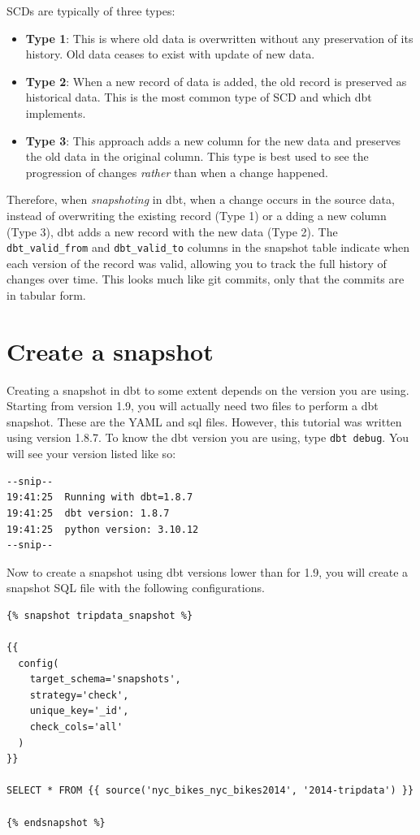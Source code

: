 \documentclass[
]{book}
\begin{document}
SCDs are typically of three types:

\begin{itemize}
\item
  \textbf{Type 1}: This is where old data is overwritten without any preservation of its history. Old data ceases to exist with update of new data.
\item
  \textbf{Type 2}: When a new record of data is added, the old record is preserved as historical data. This is the most common type of SCD and which dbt implements.
\item
  \textbf{Type 3}: This approach adds a new column for the new data and preserves the old data in the original column. This type is best used to see the progression of changes \emph{rather} than when a change happened.
\end{itemize}

Therefore, when \emph{snapshoting} in dbt, when a change occurs in the source data, instead of overwriting the existing record (Type 1) or a dding a new column (Type 3), dbt adds a new record with the new data (Type 2). The \texttt{dbt\_valid\_from} and \texttt{dbt\_valid\_to} columns in the snapshot table indicate when each version of the record was valid, allowing you to track the full history of changes over time. This looks much like git commits, only that the commits are in tabular form.

\hypertarget{create-a-snapshot}{%
\section{Create a snapshot}\label{create-a-snapshot}}

Creating a snapshot in dbt to some extent depends on the version you are using. Starting from version 1.9, you will actually need two files to perform a dbt snapshot. These are the YAML and sql files. However, this tutorial was written using version 1.8.7. To know the dbt version you are using, type \texttt{dbt\ debug}. You will see your version listed like so:

\begin{verbatim}
--snip--
19:41:25  Running with dbt=1.8.7
19:41:25  dbt version: 1.8.7
19:41:25  python version: 3.10.12
--snip--
\end{verbatim}

Now to create a snapshot using dbt versions lower than for 1.9, you will create a snapshot SQL file with the following configurations.

\begin{verbatim}
{% snapshot tripdata_snapshot %}

{{
  config(      
    target_schema='snapshots',      
    strategy='check',      
    unique_key='_id',      
    check_cols='all'    
  )  
}}  

SELECT * FROM {{ source('nyc_bikes_nyc_bikes2014', '2014-tripdata') }}

{% endsnapshot %}
\end{verbatim}
\end{document}
